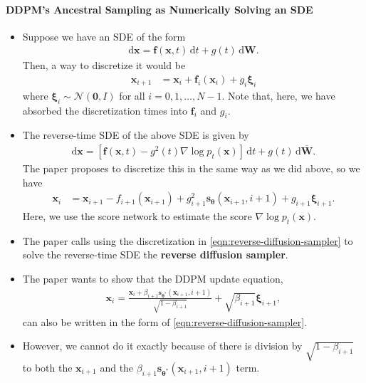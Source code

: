 \documentclass[10pt]{article}
\newcommand{\dee}{\mathrm{d}}
\newcommand{\ve}[1]{\mathbf{#1}}
\newcommand{\ves}[1]{\boldsymbol{#1}}
\newcommand{\mcal}[1]{\mathcal{#1}}
\begin{document}
\paragraph{DDPM's Ancestral Sampling as Numerically Solving an 
SDE}

\begin{itemize}
  \item Suppose we have an SDE of the form
  \begin{align*}
    \dee \ve{x} 
    = \ve{f}(\ve{x},t)\, \dee t + g(t)\, \dee\ve{W}.
  \end{align*}
  Then, a way to discretize it would be
  \begin{align*}
    \ve{x}_{i+1}
    &= \ve{x}_i + \ve{f}_i(\ve{x}_i) + g_i\ves{\xi}_i
  \end{align*}
  where $\ves{\xi}_i \sim \mcal{N}(\ve{0},I)$ for all $i = 0, 1, \dotsc, N-1$. Note that, here, we have absorbed the discretization times into $\ve{f}_i$ and $g_i$.

  \item The reverse-time SDE of the above SDE is given by
  \begin{align*}
    \dee\ve{x}
    = [\ve{f}(\ve{x},t) - g^2(t) \nabla \log p_t(\ve{x})]\, \dee t + g(t)\, \dee \overline{\ve{W}}.
  \end{align*}
  The paper proposes to discretize this in the same way as we did above, so we have
  \begin{align} \label{eqn:reverse-diffusion-sampler}
    \ve{x}_{i}
    &= \ve{x}_{i+1} - f_{i+1}(\ve{x}_{i+1}) + g_{i+1}^2 \ve{s}_{\ves{\theta}}(\ve{x}_{i+1}, i+1) + g_{i+1} \ves{\xi}_{i+1}.
  \end{align}
  Here, we use the score network to estimate the score $\nabla \log p_t(\ve{x})$.

  \item The paper calls using the discretization in \eqref{eqn:reverse-diffusion-sampler} to solve the reverse-time SDE the {\bf reverse diffusion sampler}.
  
  \item The paper wants to show that the DDPM update equation,
  \begin{align} \label{eqn:ddpm-update}
    \ve{x}_i = \frac{\ve{x}_i + \beta_{i+1} \ve{s}_{\ves{\theta}^*}(\ve{x}_{i+1}, i+1)}{\sqrt{1 - \beta_{i+1}}} + \sqrt{\beta_{i+1}}\ves{\xi}_{i+1},
  \end{align}
  can also be written in the form of \eqref{eqn:reverse-diffusion-sampler}. 
  
  \item However, we cannot do it exactly because of there is division by $\sqrt{1 - \beta_{i+1}}$ to both the $\ve{x}_{i+1}$ and the $\beta_{i+1} \ve{s}_{\ves{\theta}^*}(\ve{x}_{i+1}, i+1)$ term.
  

\end{itemize}
\end{document}
